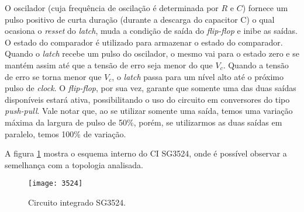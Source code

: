 O oscilador (cuja frequência de oscilação é determinada por $R$ e $C$) fornece um pulso positivo de curta duração (durante a descarga do capacitor C) o qual ocasiona o \textit{resset} do \textit{latch}, muda a condição de saída do \textit{flip-flop} e inibe as saídas. O estado do comparador é utilizado para armazenar o estado do comparador. Quando o \textit{latch} recebe um pulso do oscilador, o mesmo vai para o estado zero e se mantém assim até que a tensão de erro seja menor do que $V_c$. Quando a tensão de erro se torna menor que $V_c$, o \textit{latch} passa para um nível alto até o próximo pulso de \textit{clock}.
O \textit{flip-flop}, por sua vez, garante que somente uma das duas saídas disponíveis estará ativa, possibilitando o uso do circuito em conversores do tipo \textit{push-pull}. Vale notar que, ao se utilizar somente uma saída, temos uma variação máxima da largura de pulso de 50\%, porém, se utilizarmos as duas saídas em paralelo, temos 100\% de variação.

A figura \ref{fig:3524} mostra o esquema interno do CI SG3524, onde é possível observar a semelhança com a topologia analisada.

\begin{figure}[H]
    \centering
    \caption{Circuito integrado SG3524.}
    \texttt{[image: 3524]}
    \label{fig:3524}
\end{figure}
